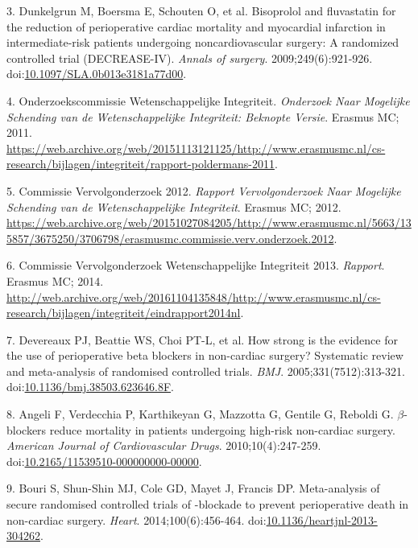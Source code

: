 \documentclass[]{article}
\begin{document}
\hypertarget{ref-dunkelgrun2009}{}
3. Dunkelgrun M, Boersma E, Schouten O, et al. Bisoprolol and
fluvastatin for the reduction of perioperative cardiac mortality and
myocardial infarction in intermediate-risk patients undergoing
noncardiovascular surgery: A randomized controlled trial (DECREASE-IV).
\emph{Annals of surgery}. 2009;249(6):921-926.
doi:\href{https://doi.org/10.1097/SLA.0b013e3181a77d00}{10.1097/SLA.0b013e3181a77d00}.

\hypertarget{ref-commissie2011}{}
4. Onderzoekscommissie Wetenschappelijke Integriteit. \emph{Onderzoek
Naar Mogelijke Schending van de Wetenschappelijke Integriteit: Beknopte
Versie}. Erasmus MC; 2011.
\url{https://web.archive.org/web/20151113121125/http://www.erasmusmc.nl/cs-research/bijlagen/integriteit/rapport-poldermans-2011}.

\hypertarget{ref-commissie2012}{}
5. Commissie Vervolgonderzoek 2012. \emph{Rapport Vervolgonderzoek Naar
Mogelijke Schending van de Wetenschappelijke Integriteit}. Erasmus MC;
2012.
\url{https://web.archive.org/web/20151027084205/http://www.erasmusmc.nl/5663/135857/3675250/3706798/erasmusmc.commissie.verv.onderzoek.2012}.

\hypertarget{ref-commissie2013}{}
6. Commissie Vervolgonderzoek Wetenschappelijke Integriteit 2013.
\emph{Rapport}. Erasmus MC; 2014.
\url{http://web.archive.org/web/20161104135848/http://www.erasmusmc.nl/cs-research/bijlagen/integriteit/eindrapport2014nl}.

\hypertarget{ref-Devereaux313}{}
7. Devereaux PJ, Beattie WS, Choi PT-L, et al. How strong is the
evidence for the use of perioperative beta blockers in non-cardiac
surgery? Systematic review and meta-analysis of randomised controlled
trials. \emph{BMJ}. 2005;331(7512):313-321.
doi:\href{https://doi.org/10.1136/bmj.38503.623646.8F}{10.1136/bmj.38503.623646.8F}.

\hypertarget{ref-Angeli2010}{}
8. Angeli F, Verdecchia P, Karthikeyan G, Mazzotta G, Gentile G, Reboldi
G. \(\beta\)-blockers reduce mortality in patients undergoing high-risk
non-cardiac surgery. \emph{American Journal of Cardiovascular Drugs}.
2010;10(4):247-259.
doi:\href{https://doi.org/10.2165/11539510-000000000-00000}{10.2165/11539510-000000000-00000}.

\hypertarget{ref-bouri2014}{}
9. Bouri S, Shun-Shin MJ, Cole GD, Mayet J, Francis DP. Meta-analysis of
secure randomised controlled trials of -blockade to prevent
perioperative death in non-cardiac surgery. \emph{Heart}.
2014;100(6):456-464.
doi:\href{https://doi.org/10.1136/heartjnl-2013-304262}{10.1136/heartjnl-2013-304262}.
\end{document}
